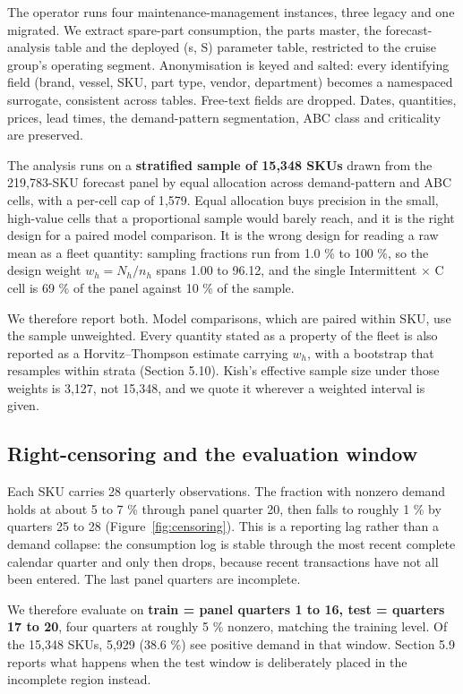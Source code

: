 \documentclass[11pt]{article}
\begin{document}
The operator runs four maintenance-management instances, three legacy and one
migrated. We extract spare-part consumption, the parts master, the
forecast-analysis table and the deployed (s, S) parameter table, restricted to
the cruise group's operating segment. Anonymisation is keyed and salted: every
identifying field (brand, vessel, SKU, part type, vendor, department) becomes a
namespaced surrogate, consistent across tables. Free-text fields are dropped.
Dates, quantities, prices, lead times, the demand-pattern segmentation, ABC
class and criticality are preserved.

The analysis runs on a \textbf{stratified sample of 15{,}348 SKUs} drawn from
the 219{,}783-SKU forecast panel by equal allocation across demand-pattern and
ABC cells, with a per-cell cap of 1{,}579. Equal allocation buys precision in
the small, high-value cells that a proportional sample would barely reach, and
it is the right design for a paired model comparison. It is the wrong design
for reading a raw mean as a fleet quantity: sampling fractions run from 1.0 \%
to 100 \%, so the design weight $w_h = N_h / n_h$ spans 1.00 to 96.12, and the
single Intermittent $\times$ C cell is 69 \% of the panel against 10 \% of the
sample.

We therefore report both. Model comparisons, which are paired within SKU, use
the sample unweighted. Every quantity stated as a property of the fleet is also
reported as a Horvitz--Thompson estimate carrying $w_h$, with a bootstrap that
resamples within strata (Section 5.10). Kish's effective sample size under those
weights is 3{,}127, not 15{,}348, and we quote it wherever a weighted interval
is given.

\subsection{Right-censoring and the evaluation window}

Each SKU carries 28 quarterly observations. The fraction with nonzero demand
holds at about 5 to 7 \% through panel quarter 20, then falls to roughly 1 \%
by quarters 25 to 28 (Figure~\ref{fig:censoring}). This is a reporting lag
rather than a demand collapse: the consumption log is stable through the most
recent complete calendar quarter and only then drops, because recent
transactions have not all been entered. The last panel quarters are incomplete.

We therefore evaluate on \textbf{train = panel quarters 1 to 16, test =
quarters 17 to 20}, four quarters at roughly 5 \% nonzero, matching the
training level. Of the 15{,}348 SKUs, 5{,}929 (38.6 \%) see positive demand in
that window. Section 5.9 reports what happens when the test window is
deliberately placed in the incomplete region instead.
\end{document}
